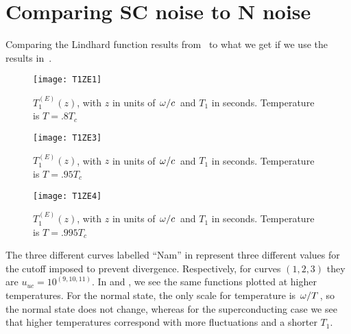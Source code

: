 \documentclass[11pt]{article}
\begin{document}
	\graphicspath{{figures/}}

	\section{Comparing SC noise to N noise} \label{sec:intro}

	Comparing the Lindhard function results from~\cite{SolyomV3} to what we get if we use the results in~\cite{Nam1967}.

	\begin{figure}[htp]
		\centering
		\texttt{[image: T1ZE1]}
		\caption{$T_{1}^{(E)}(z)$, with $z$ in units of $\flatfrac{\omega}{c}$ and $T_1$ in seconds.
		Temperature is $T = .8 T_c$}\label{fig:t1ez}
	\end{figure}

	\begin{figure}[htp]
		\centering
		\texttt{[image: T1ZE3]}
		\caption{$T_{1}^{(E)}(z)$, with $z$ in units of $\flatfrac{\omega}{c}$ and $T_1$ in seconds.
		Temperature is $T = .95 T_c$}\label{fig:t1ezpart2}
	\end{figure}

	\begin{figure}[htp]
		\centering
		\texttt{[image: T1ZE4]}
		\caption{$T_{1}^{(E)}(z)$, with $z$ in units of $\flatfrac{\omega}{c}$ and $T_1$ in seconds.
		Temperature is $T = .995 T_c$}\label{fig:t1ezpart3}
	\end{figure}


	The three different curves labelled ``Nam'' in  represent three different values for the cutoff imposed to prevent divergence.
	Respectively, for curves $(1, 2, 3)$ they are $u_{uc} = 10^{(9, 10, 11)}$.
	In  and , we see the same functions plotted at higher temperatures.
	For the normal state, the only scale for temperature is $\flatfrac{\omega}{T}$, so the normal state does not change, whereas for the superconducting case we see that higher temperatures correspond with more fluctuations and a shorter $T_1$.

	\newpage
	\printbibliography
\end{document}
